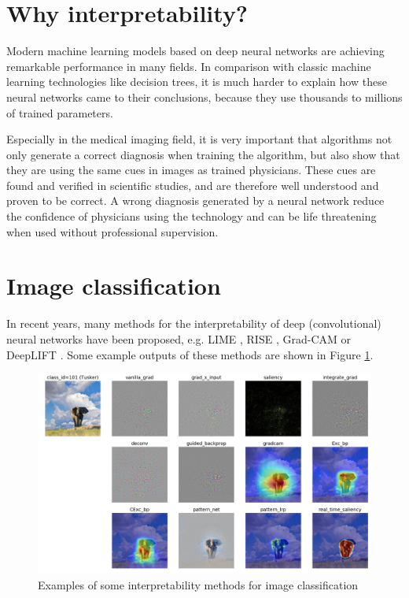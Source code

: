\section{Why interpretability?}
Modern machine learning models based on deep neural networks are achieving remarkable performance in many fields. In comparison with classic machine learning technologies like decision trees, it is much harder to explain how these neural networks came to their conclusions, because they use thousands to millions of trained parameters.

Especially in the medical imaging field, it is very important that algorithms not only generate a correct diagnosis when training the algorithm, but also show that they are using the same cues in images as trained physicians. These cues are found and verified in scientific studies, and are therefore well understood and proven to be correct. A wrong diagnosis generated by a neural network reduce the confidence of physicians using the technology and can be life threatening when used without professional supervision.

\section{Image classification}
In recent years, many methods for the interpretability of deep (convolutional) neural networks have been proposed, e.g. LIME \cite{ribeiro2016should}, RISE \cite{Petsiuk2018rise}, Grad-CAM \cite{selvaraju2017grad} or DeepLIFT \cite{shrikumar2017learning}. Some example outputs of these methods are shown in Figure \ref{classification_methods}.

\begin{figure}[h]
\centering
\includegraphics[width=14cm]{images/tusker_saliency.png}
\caption{Examples of some interpretability methods for image classification \cite{visualattribution}}
\label{classification_methods}
\end{figure}

